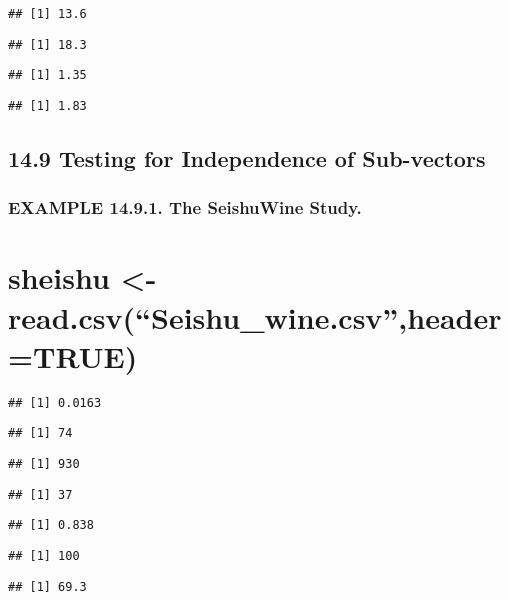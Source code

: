 \documentclass[]{article}
\begin{document}
\begin{verbatim}
## [1] 13.6
\end{verbatim}

\begin{verbatim}
## [1] 18.3
\end{verbatim}

\begin{verbatim}
## [1] 1.35
\end{verbatim}

\begin{verbatim}
## [1] 1.83
\end{verbatim}

\hypertarget{testing-for-independence-of-sub-vectors}{%
\subsection{14.9 Testing for Independence of
Sub-vectors}\label{testing-for-independence-of-sub-vectors}}

\hypertarget{example-14.9.1.-the-seishuwine-study.}{%
\subsubsection{EXAMPLE 14.9.1. The SeishuWine
Study.}\label{example-14.9.1.-the-seishuwine-study.}}

\hypertarget{sheishu---read.csvseishu_wine.csvheadertrue}{%
\section{sheishu \textless{}-
read.csv(``Seishu\_wine.csv'',header=TRUE)}\label{sheishu---read.csvseishu_wine.csvheadertrue}}

\begin{verbatim}
## [1] 0.0163
\end{verbatim}

\begin{verbatim}
## [1] 74
\end{verbatim}

\begin{verbatim}
## [1] 930
\end{verbatim}

\begin{verbatim}
## [1] 37
\end{verbatim}

\begin{verbatim}
## [1] 0.838
\end{verbatim}

\begin{verbatim}
## [1] 100
\end{verbatim}

\begin{verbatim}
## [1] 69.3
\end{verbatim}
\end{document}
